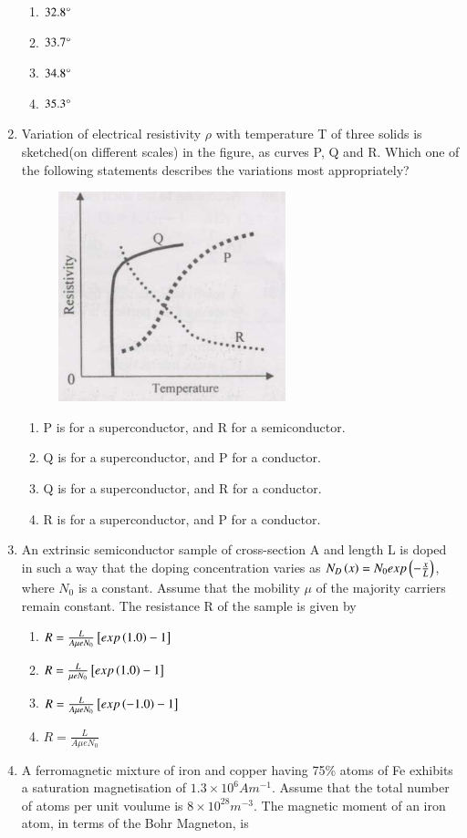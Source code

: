 \documentclass[journal]{IEEEtran}
\numberwithin{equation}{enumi}
\numberwithin{figure}{enumi}
\begin{document}
\begin{enumerate}
\begin{enumerate}
			\item $32.8\degree$
			\item $33.7\degree$
			\item $34.8\degree$
			\item $35.3\degree$
		\end{enumerate}
	\item Variation of electrical resistivity $\rho$ with temperature T of three solids is sketched(on different scales) in the figure, as curves P, Q and R. Which one of the following statements describes the variations most appropriately?
		\begin{figure}[H]
			\centering
			\includegraphics[width=0.3\linewidth]{figs/fig1.png}
			\caption{}
			\label{graph}
		\end{figure}
		\begin{enumerate}
			\item P is for a superconductor, and R for a semiconductor.
			\item Q is for a superconductor, and P for a conductor.
			\item Q is for a superconductor, and R for a conductor.
			\item R is for a superconductor, and P for a conductor.
		\end{enumerate}
	\item An extrinsic semiconductor sample of cross-section A and length L is doped in such a way that the doping concentration varies as $N_D\left(x\right) = N_0exp\left(-\frac{x}{L}\right)$, where $N_0$ is a constant. Assume that the mobility $\mu$ of the majority carriers remain constant. The resistance R of the sample is given by
		\begin{enumerate}
			\item $R = \frac{L}{A\mu eN_0}{}\left[exp\left(1.0\right) - 1\right]$
			\item $R = \frac{L}{\mu eN_0}{}\left[exp\left(1.0\right) - 1\right]$
			\item $R = \frac{L}{A\mu eN_0}{}\left[exp\left(-1.0\right) - 1\right]$
			\item $R= \frac{L}{A\mu eN_0}$
		\end{enumerate}
	\item A ferromagnetic mixture of iron and copper having 75\% atoms of Fe exhibits a saturation magnetisation of $1.3\times10^6 A m^{-1}$. Assume that the total number of atoms per unit voulume is $8\times10^{28} m^{-3}$. The magnetic moment of an iron atom, in terms of the Bohr Magneton, is

\end{enumerate}
\end{document}
